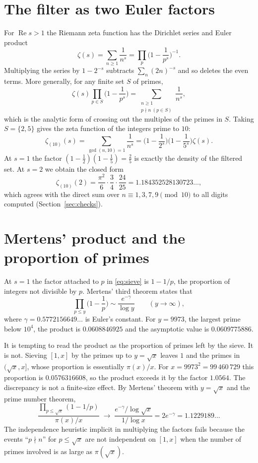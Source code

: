 \documentclass[11pt]{amsart}
\theoremstyle{remark}
\newcommand{\zt}{\zeta_{(10)}}
\begin{document}
\section{The filter as two Euler factors}\label{sec:euler}

For $\operatorname{Re}s>1$ the Riemann zeta function has the Dirichlet series and Euler product
\[
\zeta(s)=\sum_{n\ge1}\frac1{n^s}=\prod_p\Big(1-\frac1{p^s}\Big)^{-1}.
\]
Multiplying the series by $1-2^{-s}$ subtracts $\sum_n(2n)^{-s}$ and so deletes the even terms. More generally, for any finite set $S$ of primes,
\begin{equation}\label{eq:sieve}
\zeta(s)\prod_{p\in S}\Big(1-\frac1{p^s}\Big)=\sum_{\substack{n\ge1\\ p\nmid n\ (p\in S)}}\frac1{n^s},
\end{equation}
which is the analytic form of crossing out the multiples of the primes in $S$. Taking $S=\{2,5\}$ gives the zeta function of the integers prime to $10$:
\[
\zt(s)=\sum_{\gcd(n,10)=1}\frac1{n^s}=\Big(1-\frac1{2^s}\Big)\Big(1-\frac1{5^s}\Big)\zeta(s).
\]
At $s=1$ the factor $(1-\frac12)(1-\frac15)=\frac25$ is exactly the density of the filtered set. At $s=2$ we obtain the closed form
\[
\zt(2)=\frac{\pi^2}{6}\cdot\frac34\cdot\frac{24}{25}=1.184352528130723\ldots,
\]
which agrees with the direct sum over $n\equiv1,3,7,9\pmod{10}$ to all digits computed (Section~\ref{sec:checks}).

\section{Mertens' product and the proportion of primes}\label{sec:mertens}

At $s=1$ the factor attached to $p$ in \eqref{eq:sieve} is $1-1/p$, the proportion of integers not divisible by $p$. Mertens' third theorem \cite{Mertens1874} states that
\[
\prod_{p\le y}\Big(1-\frac1p\Big)\sim\frac{e^{-\gamma}}{\log y}\qquad(y\to\infty),
\]
where $\gamma=0.5772156649\ldots$ is Euler's constant. For $y=9973$, the largest prime below $10^4$, the product is $0.0608846925$ and the asymptotic value is $0.0609775886$.

It is tempting to read the product as the proportion of primes left by the sieve. It is not. Sieving $[1,x]$ by the primes up to $y=\sqrt x$ leaves $1$ and the primes in $(\sqrt x,x]$, whose proportion is essentially $\pi(x)/x$. For $x=9973^2=99\,460\,729$ this proportion is $0.0576316608$, so the product exceeds it by the factor $1.0564$. The discrepancy is not a finite-size effect. By Mertens' theorem with $y=\sqrt x$ and the prime number theorem,
\[
\frac{\prod_{p\le\sqrt x}(1-1/p)}{\pi(x)/x}\;\longrightarrow\;\frac{e^{-\gamma}/\log\sqrt x}{1/\log x}=2e^{-\gamma}=1.1229189\ldots
\]
The independence heuristic implicit in multiplying the factors fails because the events ``$p\nmid n$'' for $p\le\sqrt x$ are not independent on $[1,x]$ when the number of primes involved is as large as $\pi(\sqrt x)$.
\end{document}
